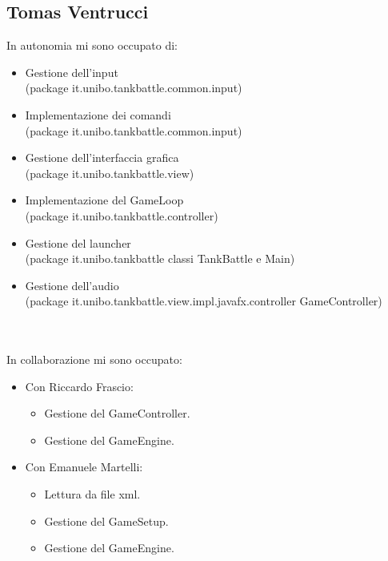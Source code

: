 \documentclass[a4paper,12pt]{report}
\begin{document}
\subsection*{Tomas Ventrucci}
In autonomia mi sono occupato di:
\begin{itemize}
	\item Gestione dell’input \\(package it.unibo.tankbattle.common.input)
	\item Implementazione dei comandi \\(package it.unibo.tankbattle.common.input)
	\item Gestione dell’interfaccia grafica \\(package it.unibo.tankbattle.view)
	\item Implementazione del GameLoop \\(package it.unibo.tankbattle.controller)
	\item Gestione del launcher \\(package it.unibo.tankbattle classi TankBattle e Main)
	\item Gestione dell’audio \\(package it.unibo.tankbattle.view.impl.javafx.controller GameController) \\ \\ \\
\end{itemize} 
In collaborazione mi sono occupato:
\begin{itemize}
	\item Con Riccardo Frascio:
		\begin{itemize}
			\item Gestione del GameController.
			\item Gestione del GameEngine.
		\end{itemize}
	\item Con Emanuele Martelli:
		\begin{itemize}
			\item Lettura da file xml.
			\item Gestione del GameSetup.
            \item Gestione del GameEngine.
		\end{itemize}
\end{itemize}
\end{document}
